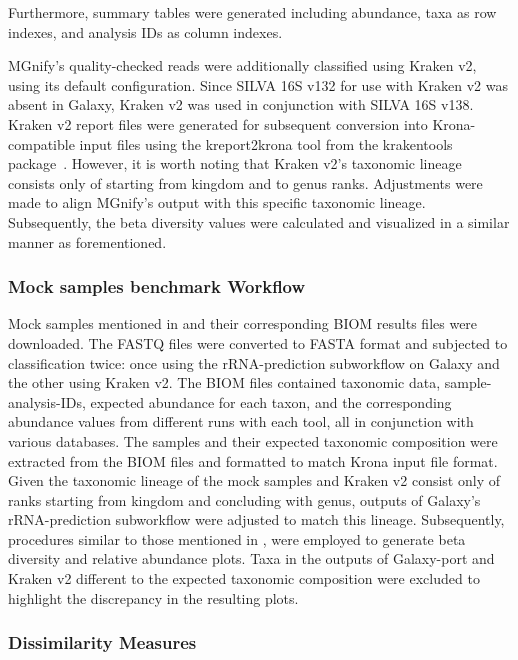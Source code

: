 Furthermore, summary tables were generated including abundance, taxa as row indexes, and analysis IDs as column indexes.\par
MGnify's quality-checked reads were additionally classified using Kraken v2, using its default configuration. Since SILVA 16S v132 for use with Kraken v2 was absent in Galaxy, Kraken v2 was used in conjunction with SILVA 16S v138. Kraken v2 report files were generated for subsequent conversion into Krona-compatible input files using the kreport2krona tool from the krakentools package~\cite{noauthor_tools-iuctoolskrakentools_nodate}. However, it is worth noting that Kraken v2's taxonomic lineage consists only of starting from kingdom and to genus ranks. Adjustments were made to align MGnify's output with this specific taxonomic lineage. 
Subsequently, the beta diversity values were calculated and visualized in a similar manner as forementioned.

\subsubsection{Mock samples benchmark Workflow}\label{subsubsec:Benchmark-Workflow-mock}

Mock samples mentioned in  and their corresponding BIOM results files were downloaded. The FASTQ files were converted to FASTA format and subjected to classification twice: once using the rRNA-prediction subworkflow on Galaxy and the other using Kraken v2.
The BIOM files contained taxonomic data, sample-analysis-IDs, expected abundance for each taxon, and the corresponding abundance values from different runs with each tool, all in conjunction with various databases. The samples and their expected taxonomic composition were extracted from the BIOM files and formatted to match Krona input file format. Given the taxonomic lineage of the mock samples and Kraken v2 consist only of ranks starting from kingdom and concluding with genus, outputs of Galaxy's rRNA-prediction subworkflow were adjusted to match this lineage.
Subsequently, procedures similar to those mentioned in , were employed to generate beta diversity and relative abundance plots. Taxa in the outputs of Galaxy-port and Kraken v2 different to the expected taxonomic composition were excluded to highlight the discrepancy in the resulting plots.

\subsubsection{Dissimilarity Measures}\label{subsubsec:Dissimilarity-Measures}

